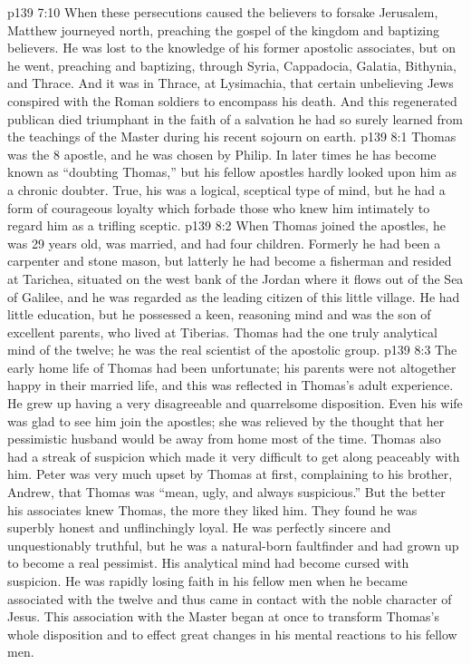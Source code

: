 \vs p139 7:10 \pc When these persecutions caused the believers to forsake Jerusalem, Matthew journeyed north, preaching the gospel of the kingdom and baptizing believers. He was lost to the knowledge of his former apostolic associates, but on he went, preaching and baptizing, through Syria, Cappadocia, Galatia, Bithynia, and Thrace. And it was in Thrace, at Lysimachia, that certain unbelieving Jews conspired with the Roman soldiers to encompass his death. And this regenerated publican died triumphant in the faith of a salvation he had so surely learned from the teachings of the Master during his recent sojourn on earth.
\vs p139 8:1 Thomas was the 8 apostle, and he was chosen by Philip. In later times he has become known as “doubting Thomas,” but his fellow apostles hardly looked upon him as a chronic doubter. True, his was a logical, sceptical type of mind, but he had a form of courageous loyalty which forbade those who knew him intimately to regard him as a trifling sceptic.
\vs p139 8:2 When Thomas joined the apostles, he was 29 years old, was married, and had four children. Formerly he had been a carpenter and stone mason, but latterly he had become a fisherman and resided at Tarichea, situated on the west bank of the Jordan where it flows out of the Sea of Galilee, and he was regarded as the leading citizen of this little village. He had little education, but he possessed a keen, reasoning mind and was the son of excellent parents, who lived at Tiberias. Thomas had the one truly analytical mind of the twelve; he was the real scientist of the apostolic group.
\vs p139 8:3 The early home life of Thomas had been unfortunate; his parents were not altogether happy in their married life, and this was reflected in Thomas’s adult experience. He grew up having a very disagreeable and quarrelsome disposition. Even his wife was glad to see him join the apostles; she was relieved by the thought that her pessimistic husband would be away from home most of the time. Thomas also had a streak of suspicion which made it very difficult to get along peaceably with him. Peter was very much upset by Thomas at first, complaining to his brother, Andrew, that Thomas was “mean, ugly, and always suspicious.” But the better his associates knew Thomas, the more they liked him. They found he was superbly honest and unflinchingly loyal. He was perfectly sincere and unquestionably truthful, but he was a natural\hyp{}born faultfinder and had grown up to become a real pessimist. His analytical mind had become cursed with suspicion. He was rapidly losing faith in his fellow men when he became associated with the twelve and thus came in contact with the noble character of Jesus. This association with the Master began at once to transform Thomas’s whole disposition and to effect great changes in his mental reactions to his fellow men.
